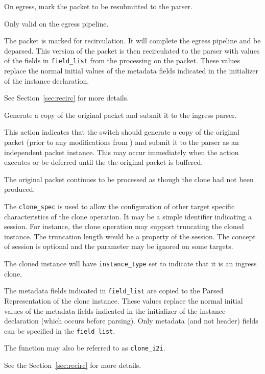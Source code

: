 \documentclass[12pt]{article}
\begin{document}

{ %
On egress, mark the packet to be resubmitted to the parser.
}
{ %
}
{ %
Only valid on the egress pipeline.

The packet is marked for recirculation. It will complete the egress pipeline 
and be deparsed.  This version of the packet is then recirculated to the parser 
with values of the fields in \texttt{field_list} from the processing on the packet. 
These values replace the normal initial values of the metadata fields indicated 
in the initializer of the instance declaration.

See Section~\ref{sec:recirc} for more details.

}


{ %
Generate a copy of the original packet and submit it to the ingress parser.
}
{ %
}
{ %
This action indicates that the switch should generate a copy of the original 
packet (prior to any modifications from \matchaction) and submit it to the 
parser as an independent packet instance.  This may occur immediately when 
the action executes or be deferred until the the original packet is buffered. 
 

The original packet continues to be processed as though the clone had not 
been produced.

The \texttt{clone_spec} is used to allow the configuration of other target specific 
characteristics of the clone operation. It may be a simple identifier indicating 
a session. For instance, the clone operation may support truncating the cloned 
instance. The truncation length would be a property of the session. The concept 
of session is optional and the parameter may be ignored on some targets.

The cloned instance will have \texttt{instance_type} set to indicate that it is an 
ingress clone. 

The metadata fields indicated in \texttt{field_list} are copied to the Parsed Representation 
of the clone instance. These values replace the normal initial values of the 
metadata fields indicated in the initializer of the instance declaration (which 
occurs before parsing). Only metadata (and not header) fields can be specified in the \texttt{field_list}.

The function may also be referred to as \texttt{clone_i2i}.

See the Section~\ref{sec:recirc} for more details.
}
\end{document}
